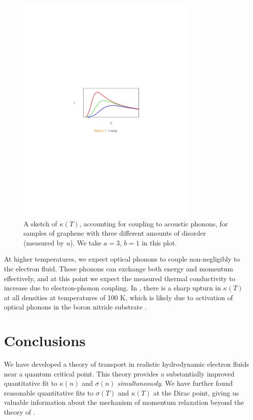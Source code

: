 \begin{figure}[t]
\centering
\includegraphics[width=3.5in]{figures/hydro_theory/ephsketchplot.pdf}
\caption{A sketch of $\kappa(T)$, accounting for coupling to acoustic phonons, for samples of graphene with three different amounts of disorder (measured by $u$).  We take $a=3$, $b=1$ in this plot.}
\label{fig:AL_ephfig}
\end{figure}


At higher temperatures, we expect optical phonons to couple non-negligibly to the electron fluid.   These phonons can exchange both energy and momentum effectively,  and at this point we expect the measured thermal conductivity to increase due to electron-phonon coupling.   In \cite{crossno_observation_2016},  there is a sharp upturn in $\kappa(T)$ at all densities at temperatures of 100 K, which is likely due to activation of optical phonons in the boron nitride substrate \cite{crossno_development_2015}.


\section{Conclusions}

We have developed a theory of transport in realistic hydrodynamic electron fluids near a quantum critical point.    This theory provides a substantially improved quantitative fit to $\kappa(n)$ and $\sigma(n)$ \emph{simultaneously}.    We have further found reasonable quantitative fits to $\sigma(T)$ and $\kappa(T)$ at the Dirac point, giving us valuable information about the mechanism of momentum relaxation beyond the theory of \cite{hartnoll_theory_2007}.

